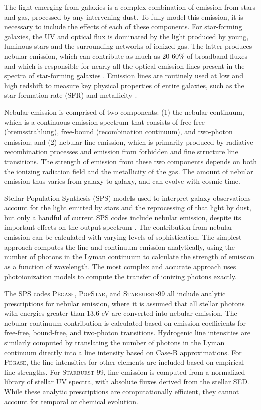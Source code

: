 \documentclass[trackchanges, twocolumn, tighten]{aastex61}
\newcommand{\Pegase}{\textsc{P{\'e}gase}\xspace}
\newcommand{\SB}{\textsc{Starburst-99}\xspace}
\newcommand{\Popstar}{\textsc{PopStar}\xspace}
\begin{document}
The light emerging from galaxies is a complex combination of emission from stars and gas, processed by any intervening dust. To fully model this emission, it is necessary to include the effects of each of these components. For star-forming galaxies, the UV and optical flux is dominated by the light produced by young, luminous stars and the surrounding networks of ionized gas. The latter produces nebular emission, which can contribute as much as 20-60\% of broadband fluxes and which is responsible for nearly all the optical emission lines present in the spectra of star-forming galaxies \citep{Anders03, Reines10}. Emission lines are routinely used at low and high redshift to measure key physical properties of entire galaxies, such as the star formation rate (SFR) and metallicity \citep[e.g.,][]{Tremonti04, Kewley08}.

Nebular emission is comprised of two components: (1) the nebular continuum, which is a continuous emission spectrum that consists of free-free (bremsstrahlung), free-bound (recombination continuum), and two-photon emission; and (2) nebular line emission, which is primarily produced by radiative recombination processes and emission from forbidden and fine structure line transitions. The strength of emission from these two components depends on both the ionizing radiation field and the metallicity of the gas. The amount of nebular emission thus varies from galaxy to galaxy, and can evolve with cosmic time.

Stellar Population Synthesis (SPS) models used to interpret galaxy observations account for the light emitted by stars and the reprocessing of that light by dust, but only a handful of current SPS codes include nebular emission, despite its important effects on the output spectrum \citep[see reviews in][]{Walcher11, Conroy13}. The contribution from nebular emission can be calculated with varying levels of sophistication. The simplest approach computes the line and continuum emission analytically, using the number of photons in the Lyman continuum to calculate the strength of emission as a function of wavelength. The most complex and accurate approach uses photoionization models to compute the transfer of ionizing photons exactly.

The SPS codes \Pegase \citep{Fioc99}, \Popstar \citep{Molla09}, and \SB \citep{Leitherer99} all include analytic prescriptions for nebular emission, where it is assumed that all stellar photons with energies greater than 13.6 eV are converted into nebular emission. The nebular continuum contribution is calculated based on emission coefficients for free-free, bound-free, and two-photon transitions. Hydrogenic line intensities are similarly computed by translating the number of photons in the Lyman continuum directly into a line intensity based on Case-B approximations. For \Pegase, the line intensities for other elements are included based on empirical line strengths. For \SB, line emission is computed from a normalized library of stellar UV spectra, with absolute fluxes derived from the stellar SED. While these analytic prescriptions are computationally efficient, they cannot account for temporal or chemical evolution.
\end{document}
